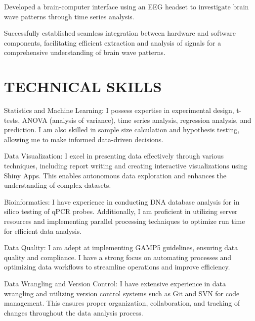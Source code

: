 \documentclass[]{plushcv}
\begin{document}
\clearpage
\begin{minipage}[t]{0.70\textwidth} 
\sectionsep
\sectionsep
\sectionsep
\sectionsep
\sectionsep
\sectionsep
\sectionsep
\sectionsep




\begin{tightemize}
\sectionsep
\item Developed a brain-computer interface using an EEG headset to investigate brain wave patterns through time series analysis.
\item Successfully established seamless integration between hardware and software components, facilitating efficient extraction and analysis of signals for a comprehensive understanding of brain wave patterns.
\end{tightemize}

\sectionsep
\sectionsep

\section{TECHNICAL SKILLS}
\begin{tightemize}
\sectionsep
\item Statistics and Machine Learning: I possess expertise in experimental design, t-tests, ANOVA (analysis of variance), time series analysis, regression analysis, and prediction. I am also skilled in sample size calculation and hypothesis testing, allowing me to make informed data-driven decisions.
\item Data Visualization: I excel in presenting data effectively through various techniques, including report writing and creating interactive visualizations using Shiny Apps. This enables autonomous data exploration and enhances the understanding of complex datasets.
\item Bioinformatics: I have experience in conducting DNA database analysis for in silico testing of qPCR probes. Additionally, I am proficient in utilizing server resources and implementing parallel processing techniques to optimize run time for efficient data analysis.
\item Data Quality: I am adept at implementing GAMP5 guidelines, ensuring data quality and compliance. I have a strong focus on automating processes and optimizing data workflows to streamline operations and improve efficiency.
\item Data Wrangling and Version Control: I have extensive experience in data wrangling and utilizing version control systems such as Git and SVN for code management. This ensures proper organization, collaboration, and tracking of changes throughout the data analysis process.
\end{tightemize}


\end{minipage}
\end{document}
